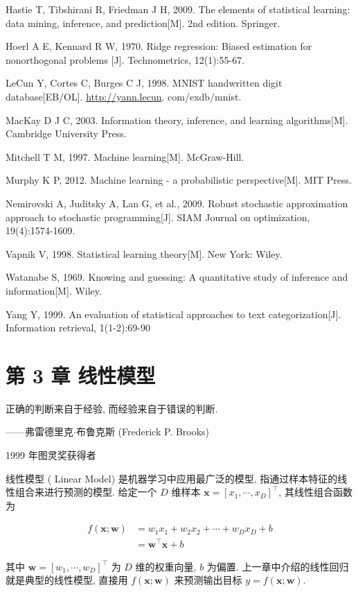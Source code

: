 \documentclass[10pt]{article}
\begin{document}
Hastie T, Tibshirani R, Friedman J H, 2009. The elements of statistical learning: data mining, inference, and prediction[M]. 2nd edition. Springer.

Hoerl A E, Kennard R W, 1970. Ridge regression: Biased estimation for nonorthogonal problems [J]. Technometrics, 12(1):55-67.

LeCun Y, Cortes C, Burges C J, 1998. MNIST handwritten digit database[EB/OL]. \href{http://yann.lecun}{http://yann.lecun}. com/exdb/mnist.

MacKay D J C, 2003. Information theory, inference, and learning algorithms[M]. Cambridge University Press.

Mitchell T M, 1997. Machine learning[M]. McGraw-Hill.

Murphy K P, 2012. Machine learning - a probabilistic perspective[M]. MIT Press.

Nemirovski A, Juditsky A, Lan G, et al., 2009. Robust stochastic approximation approach to stochastic programming[J]. SIAM Journal on optimization, 19(4):1574-1609.

Vapnik V, 1998. Statistical learning theory[M]. New York: Wiley.

Watanabe S, 1969. Knowing and guessing: A quantitative study of inference and information[M]. Wiley.

Yang Y, 1999. An evaluation of statistical approaches to text categorization[J]. Information retrieval, 1(1-2):69-90

\section*{第 3 章 线性模型}
正确的判断来自于经验, 而经验来自于错误的判断.

——弗雷德里克$\cdot$布鲁克斯 (Frederick P. Brooks)

1999 年图灵奖获得者

线性模型 ( Linear Model) 是机器学习中应用最广泛的模型, 指通过样本特征的线性组合来进行预测的模型. 给定一个 $D$ 维样本 $\boldsymbol{x}=\left[x_{1}, \cdots, x_{D}\right]^{\top}$, 其线性组合函数为


\begin{align*}
f(\boldsymbol{x} ; \boldsymbol{w}) & =w_{1} x_{1}+w_{2} x_{2}+\cdots+w_{D} x_{D}+b  \tag{3.1}\\
& =\boldsymbol{w}^{\top} \boldsymbol{x}+b \tag{3.2}
\end{align*}


其中 $\boldsymbol{w}=\left[w_{1}, \cdots, w_{D}\right]^{\top}$ 为 $D$ 维的权重向量, $b$ 为偏置. 上一章中介绍的线性回归就是典型的线性模型, 直接用 $f(\boldsymbol{x} ; \boldsymbol{w})$ 来预测输出目标 $y=f(\boldsymbol{x} ; \boldsymbol{w})$.
\end{document}
